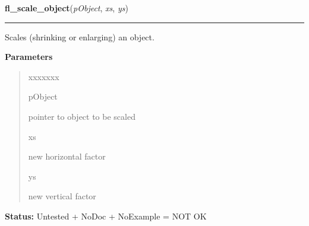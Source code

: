 \hspace{.8\funcindent}\begin{boxedminipage}{\funcwidth}

    \raggedright \textbf{fl\_scale\_object}(\textit{pObject}, \textit{xs}, \textit{ys})

    \vspace{-1.5ex}

    \rule{\textwidth}{0.5\fboxrule}
\setlength{\parskip}{2ex}
    Scales (shrinking or enlarging) an object.

\setlength{\parskip}{1ex}
      \textbf{Parameters}
      \vspace{-1ex}

      \begin{quote}
        \begin{Ventry}{xxxxxxx}

          \item[pObject]

          pointer to object to be scaled

          \item[xs]

          new horizontal factor

          \item[ys]

          new vertical factor

        \end{Ventry}

      \end{quote}

\textbf{Status:} Untested + NoDoc + NoExample = NOT OK



    \end{boxedminipage}

    \label{xformslib:library:fl_show_object}

    \vspace{0.5ex}

